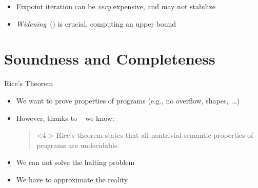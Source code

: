 \documentclass[
   aspectratio=169, %
   10pt, %
   uniqueslidenumber,
   sectiontitleslides,
   professionalfonts
]{beamer}
\begin{document}
\begin{frame}[fragile]{\insertsubsection}
\begin{onlyenv}
\end{onlyenv}
\begin{itemize}
   \itemsep6.5pt
   \item<13-> Fixpoint iteration can be \textit{very} expensive, and may not stabilize %
   \item<14-> \textit{Widening}~(\absexpr{\widen}) is crucial, computing an upper bound
\end{itemize}
\end{frame}

\newsavebox\pinguA
\savebox\pinguA{\tikz{\pingu[wings grab,eyes sad,cup=red,wool hat]}}
\section{Soundness and Completeness}
\begin{frame}{Rice's Theorem}
   \begin{itemize}
      \itemsep12pt
      \item<2-> We want to prove properties of programs (e.g., no overflow, shapes,~\ldots)
      \item<3-> However, thanks to \citeauthor{rice1953classes}~\cite{rice1953classes} we know:\smallskip\\
      \begin{quote}<4->
         Rice's theorem states that all nontrivial semantic properties of programs are undecidable.~\cite[100]{cousout2021principles}
      \end{quote}
      \item<5-> We can not solve the halting problem
      \item<6-> We have to approximate the reality
   \end{itemize}
\end{frame}
\end{document}
